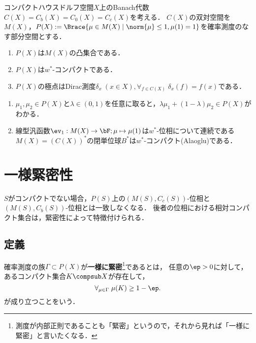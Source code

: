 \documentclass[uplatex,dvipdfmx]{jsreport}
\begin{document}
\begin{proposition}
    コンパクトハウスドルフ空間$X$上のBanach代数$C(X)=C_b(X)=C_0(X)=C_c(X)$を考える．
    $C(X)$の双対空間を$M(X)$，$P(X):=\Brace{\mu\in M(X)\mid\norm{\mu}\le 1,\mu(1)=1}$を確率測度のなす部分空間とする．
    \begin{enumerate}
        \item $P(X)$は$M(X)$の凸集合である．
        \item $P(X)$は$w^*$-コンパクトである．
        \item $P(X)$の極点はDirac測度$\delta_x\;(x\in X),\forall_{f\in C(X)}\;\delta_x(f)=f(x)$である．
    \end{enumerate}
\end{proposition}
\begin{Proof}\mbox{}
    \begin{enumerate}
        \item $\mu_1,\mu_2\in P(X)$と$\lambda\in(0,1)$を任意に取ると，$\lambda\mu_1+(1-\lambda)\mu_2\in P(X)$がわかる．
        \item 線型汎函数$\ev_1:M(X)\to\bF;\mu\mapsto\mu(1)$は$w^*$-位相について連続である
        $M(X)=(C(X))^*$の閉単位球$B^*$は$w^*$-コンパクト(Alaoglu)である．
    \end{enumerate}
\end{Proof}

\section{一様緊密性}

\begin{tcolorbox}[colframe=ForestGreen, colback=ForestGreen!10!white,breakable,colbacktitle=ForestGreen!40!white,coltitle=black,fonttitle=\bfseries\sffamily,
title=一様可積分性に対応する概念である]
    $S$がコンパクトでない場合，$P(S)$上の$(M(S),C_c(S))$-位相と$(M(S),C_b(S))$-位相とは一致しなくなる．
    後者の位相における相対コンパクト集合は，緊密性によって特徴付けられる．
\end{tcolorbox}

\subsection{定義}

\begin{definition}
    確率測度の族$\Gamma\subset P(X)$が\textbf{一様に緊密}\footnote{測度が内部正則であることも「緊密」というので，それから見れば「一様に緊密」と言いたくなる．}であるとは，
    任意の$\ep>0$に対して，あるコンパクト集合$K\compsub X$が存在して，
    \[\forall_{\mu\in\Gamma}\;\mu(K)\ge1-\ep.\]
    が成り立つことをいう．
\end{definition}
\end{document}
